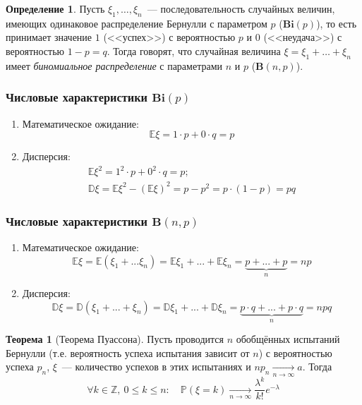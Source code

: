 \documentclass[oneside,final,14pt]{extreport}
\theoremstyle{plain}
\theoremstyle{definition}
\newtheorem*{defn}{Определение}
\theoremstyle{named}
\newtheorem*{namedthm}{Теорема}
\begin{document}
\begin{defn}
    Пусть $\xi_1, \ldots, \xi_n$~--- последовательность случайных величин, имеющих одинаковое распределение Бернулли с параметром $p$ ($\mathbf{Bi}(p)$), то есть принимает значение $1$ (<<успех>>) с вероятностью $p$ и $0$ (<<неудача>>) с вероятностью $1 - p = q$. Тогда говорят, что случайная величина $\xi = \xi_1 + \ldots + \xi_n$ имеет {\it биномиальное распределение} с параметрами $n$ и $p$ ($\mathbf{B}(n, p)$).
\end{defn}

\subsubsection{Числовые характеристики $\mathbf{Bi}(p)$}
\begin{enumerate}
    \item Математическое ожидание:
    \begin{equation*}
        \mathbb{E}\xi =  1 \cdot p + 0 \cdot q = p
    \end{equation*}
    \item Дисперсия:
    \begin{align*}
        \mathbb{E}\xi^2 = 1^2 \cdot p + 0^2 \cdot q = p; \\
        \mathbb{D}\xi = \mathbb{E}\xi^2 - (\mathbb{E}\xi)^2 = p - p^2 = p \cdot (1 - p) = pq
    \end{align*}
\end{enumerate}

\subsubsection{Числовые характеристики $\mathbf{B}(n, p)$}
\begin{enumerate}
    \item Математическое ожидание:
    \begin{equation*}
        \mathbb{E}\xi = \mathbb{E}(\xi_1 + ... \xi_n) = \mathbb{E}\xi_1 + ... + \mathbb{E}\xi_n = \underbrace{p + ... + p}_{n} = np
    \end{equation*}
    \item Дисперсия:
    \begin{equation*}
        \mathbb{D}\xi = \mathbb{D}(\xi_1 + ... + \xi_n) = \mathbb{D}\xi_1 + ... + \mathbb{D}\xi_n = \underbrace{p \cdot q + ... + p \cdot q}_{n} = npq
    \end{equation*}
\end{enumerate}

\begin{namedthm}[Теорема Пуассона]
    Пусть проводится $n$ обобщённых испытаний Бернулли (т.е. вероятность успеха испытания зависит от $n$) с вероятностью успеха $p_n$, $\xi$~--- количество успехов в этих испытаниях и $n p_{n} \underset{n \to \infty}{\longrightarrow} a$. Тогда
    \begin{equation*}
        \forall k \in \mathbb{Z},~ 0 \leqslant k \leqslant n: \quad \mathbb{P}\left(\xi=k\right) \underset{n \to \infty}{\longrightarrow} \frac{\lambda^{k}}{k !} e^{-\lambda}
    \end{equation*}
\end{namedthm}
\end{document}
